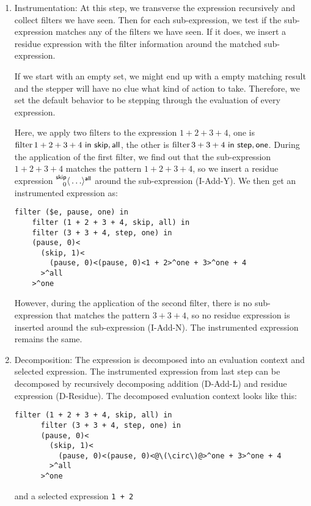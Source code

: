 \begin{enumerate}
  \item Instrumentation: At this step, we transverse the expression recursively and collect filters we have seen. Then for each sub-expression, we test if the sub-expression matches any of the filters we have seen. If it does, we insert a residue expression with the filter information around the matched sub-expression.

  If we start with an empty set, we might end up with a empty matching result and the stepper will have no clue what kind of action to take. Therefore, we set the default behavior to be stepping through the evaluation of every expression.

  Here, we apply two filters to the expression \(1 + 2 + 3 + 4\), one is \(\operatorname{filter}{} 1 + 2 + 3 + 4~\mathsf{in}~\mathsf{skip}, \mathsf{all}\), the other is \(\operatorname{filter}{} 3 + 3 + 4~\mathsf{in}~\mathsf{step}, \mathsf{one}\). During the application of the first filter, we find out that the sub-expression \(1 + 2 + 3 + 4\) matches the pattern \(1 + 2 + 3 + 4\), so we insert a residue expression \(\prescript{\mathsf{skip}}{0}{\langle} \ldots \rangle^{\mathsf{all}}\) around the sub-expression (I-Add-Y). We then get an instrumented expression as:
  \begin{lstlisting}[language=hazel]
    filter ($e, pause, one) in
    filter (1 + 2 + 3 + 4, skip, all) in
    filter (3 + 3 + 4, step, one) in
    (pause, 0)<
      (skip, 1)<
        (pause, 0)<(pause, 0)<1 + 2>^one + 3>^one + 4
      >^all
    >^one
  \end{lstlisting}

  However, during the application of the second filter, there is no sub-expression that matches the pattern \(3 + 3 + 4\), so no residue expression is inserted around the sub-expression (I-Add-N). The instrumented expression remains the same.

  \item Decomposition: The expression is decomposed into an evaluation context and selected expression. The instrumented expression from last step can be decomposed by recursively decomposing addition (D-Add-L) and residue expression (D-Residue). The decomposed evaluation context looks like this:
    \begin{lstlisting}[language=hazel]
      filter (1 + 2 + 3 + 4, skip, all) in
      filter (3 + 3 + 4, step, one) in
      (pause, 0)<
        (skip, 1)<
          (pause, 0)<(pause, 0)<@\(\circ\)@>^one + 3>^one + 4
        >^all
      >^one
    \end{lstlisting}
    and a selected expression \lstinline{1 + 2}


\end{enumerate}

